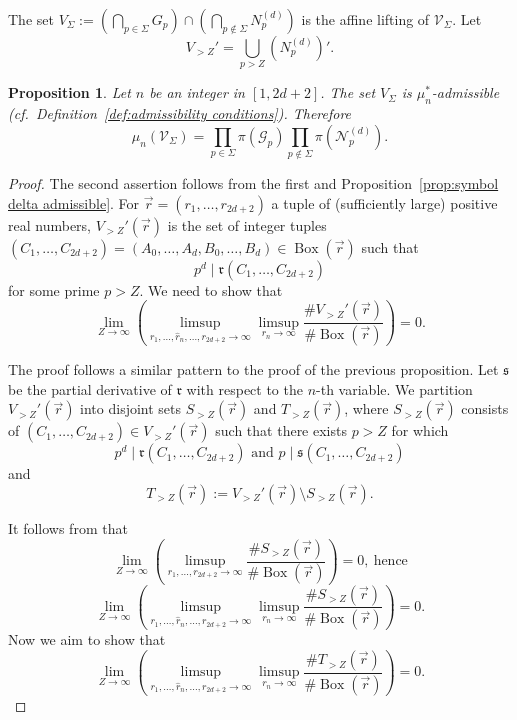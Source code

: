 \documentclass[12pt]{amsart}
\newtheorem{proposition}[theorem]{Proposition}
\newcommand{\cN}{\mathcal{N}}
\newcommand{\cG}{\mathcal{G}}
\newcommand{\V}{\mathcal{V}}
\newcommand{\op}[1]{\operatorname{#1}}
\numberwithin{equation}{section}
\begin{document}
The set $V_{\Sigma}:=\left(\bigcap_{p\in\Sigma} G_p\right)\cap\left(\bigcap_{p\notin\Sigma} N_p^{(d)}\right)$ is the affine lifting of $\V_{\Sigma}$. Let 
$$V_{>Z}'=\bigcup_{p>Z} (N_p^{(d)})'.$$
\begin{proposition}\label{mu admissible proposition}
    Let $n$ be an integer in $[1,2d+2]$. The set $V_{\Sigma}$ is $\mu_n^*$-admissible (cf.~Definition~\ref{def:admissibility conditions}). Therefore
    $$\mu_n(\V_{\Sigma})=\prod_{p\in\Sigma}\pi(\cG_p)\prod_{p\notin\Sigma}\pi(\cN_p^{(d)}).$$
\end{proposition}
\begin{proof}
    The second assertion follows from the first and Proposition~\ref{prop:symbol delta admissible}.  For $\vec{r}=(r_1,\ldots,r_{2d+2})$ a tuple of (sufficiently large) positive real numbers, $V_{>Z}'(\vec{r})$
    is the set of integer tuples $(C_1,\ldots,C_{2d+2})=(A_0,\ldots,A_d,B_0,\ldots,B_d)\in \op{Box}(\vec{r})$ such that 
$$p^{d}\mid \mathfrak{r}(C_1,\ldots,C_{2d+2})$$
for some prime $p>Z$. We need to show that 
    \[\lim_{Z\rightarrow \infty} \left(\limsup_{r_1, \dots, \hat{r}_n, \dots, r_{2d+2}\rightarrow\infty} \limsup_{r_{n}\rightarrow \infty}\frac{\# V_{>Z}'(\vec{r})}{\# \op{Box}(\vec{r})}\right)=0.\] 
    
    The proof follows a similar pattern to the proof of the previous proposition. Let 
    $\displaystyle\mathfrak{s}$ be the partial derivative 
    of $\mathfrak{r}$ with respect to the $n$-th variable. 
    We partition $V_{>Z}'(\vec{r})$ into disjoint sets $S_{>Z}(\vec{r})$ and $T_{>Z}(\vec{r})$, where $S_{>Z}(\vec{r})$ consists of $(C_1, \dots, C_{2d+2})\in V_{>Z}'(\vec{r})$ such that there exists $p>Z$ for which 
    \[p^d\mid\mathfrak{r}(C_1, \dots, C_{2d+2})\text{ and }p\mid\mathfrak{s}(C_1, \dots, C_{2d+2})\] and 
    \[T_{>Z}(\vec{r}):=V_{>Z}'(\vec{r})\setminus S_{>Z}(\vec{r}).\]

    It follows from \cite[Lemma~5.1]{Poonensquarefree} that
    $$\lim_{Z\rightarrow \infty} \left(\limsup_{r_1, \dots, r_{2d+2}\rightarrow\infty} \frac{\# S_{>Z}(\vec{r})}{\# \op{Box}(\vec{r})}\right)=0,\ \text{hence}$$
    $$\lim_{Z\rightarrow \infty} \left(\limsup_{r_1, \dots, \hat{r}_n, \dots, r_{2d+2}\rightarrow\infty} \limsup_{r_{n}\rightarrow \infty} \frac{\# S_{>Z}(\vec{r})}{\# \op{Box}(\vec{r})}\right)=0.$$
    Now we aim to show that
    $$\lim_{Z\rightarrow \infty} \left(\limsup_{r_1, \dots, \hat{r}_n, \dots, r_{2d+2}\rightarrow\infty} \limsup_{r_{n}\rightarrow \infty} \frac{\# T_{>Z}(\vec{r})}{\# \op{Box}(\vec{r})}\right)=0.$$
    

\end{proof}
\end{document}
